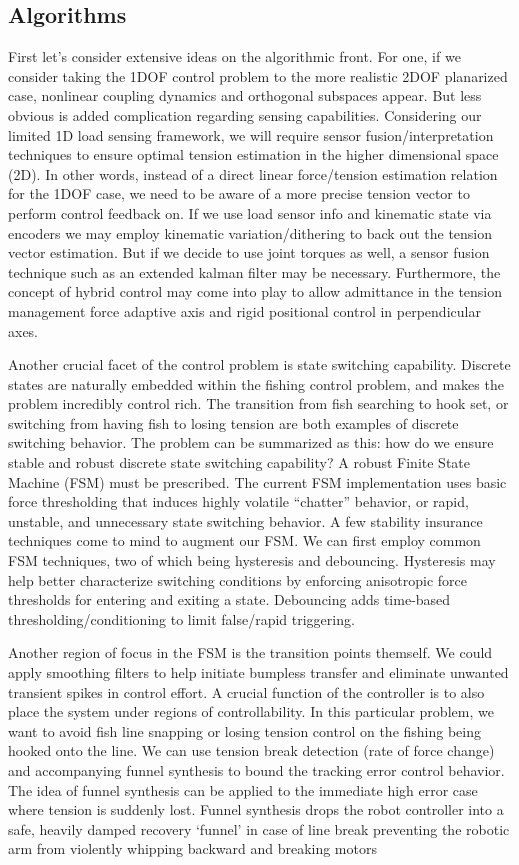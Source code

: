 \documentclass[conference]{IEEEtran}
\begin{document}
\subsection{Algorithms}
First let's consider extensive ideas on the algorithmic front. For one, if we consider taking the 1DOF control problem to the more realistic 2DOF planarized case, nonlinear coupling dynamics and orthogonal subspaces appear. But less obvious is added complication regarding sensing capabilities. Considering our limited 1D load sensing framework, we will require sensor fusion/interpretation techniques to ensure optimal tension estimation in the higher dimensional space (2D). In other words, instead of a direct linear force/tension estimation relation for the 1DOF case, we need to be aware of a more precise tension vector to perform control feedback on. If we use load sensor info and kinematic state via encoders we may employ kinematic variation/dithering to back out the tension vector estimation. But if we decide to use joint torques as well, a sensor fusion technique such as an extended kalman filter may be necessary. Furthermore, the concept of hybrid control may come into play to allow admittance in the tension management force adaptive axis and rigid positional control in perpendicular axes.

Another crucial facet of the control problem is state switching capability. Discrete states are naturally embedded within the fishing control problem, and makes the problem incredibly control rich. The transition from fish searching to hook set, or switching from having fish to losing tension are both examples of discrete switching behavior. The problem can be summarized as this: how do we ensure stable and robust discrete state switching capability? A robust Finite State Machine (FSM) must be prescribed. The current FSM implementation uses basic force thresholding that induces highly volatile “chatter” behavior, or rapid, unstable, and unnecessary state switching behavior. A few stability insurance techniques come to mind to augment our FSM. We can first employ common FSM techniques, two of which being hysteresis and debouncing. Hysteresis may help better characterize switching conditions by enforcing anisotropic force thresholds for entering and exiting a state. Debouncing adds time-based thresholding/conditioning to limit false/rapid triggering.

Another region of focus in the FSM is the transition points themself. We could apply smoothing filters to help initiate bumpless transfer and eliminate unwanted transient spikes in control effort. A crucial function of the controller is to also place the system under regions of controllability. In this particular problem, we want to avoid fish line snapping or losing tension control on the fishing being hooked onto the line. We can use tension break detection (rate of force change) and accompanying funnel synthesis to bound the tracking error control behavior. The idea of funnel synthesis can be applied to the immediate high error case where tension is suddenly lost. Funnel synthesis drops the robot controller into a safe, heavily damped recovery ‘funnel’ in case of line break preventing the robotic arm from violently whipping backward and breaking motors
\end{document}
